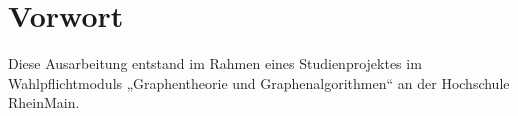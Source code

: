 \section*{Vorwort}
Diese Ausarbeitung entstand im Rahmen eines Studienprojektes im Wahlpflichtmoduls
„Graphentheorie und Graphenalgorithmen“ an der Hochschule RheinMain.
